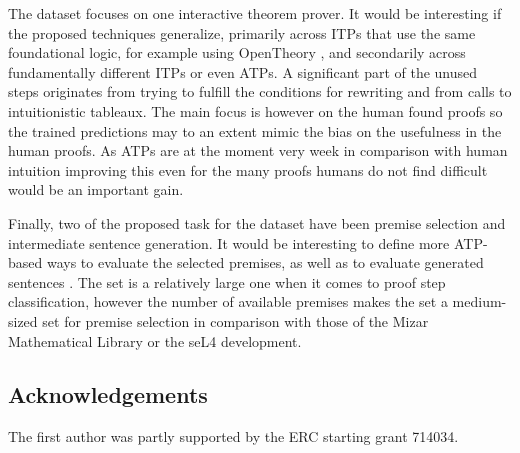 \documentclass[]{article}
\begin{document}
The dataset focuses on one interactive theorem prover. It would be interesting
if the proposed techniques generalize, primarily across ITPs that use the same
foundational logic, for example using OpenTheory \citep{opentheory}, and secondarily
across fundamentally different ITPs or even ATPs. A significant part of the unused steps
originates from trying to fulfill the conditions for rewriting and
from calls to intuitionistic tableaux.
The main focus is however on the human found proofs so the trained predictions may
to an extent mimic the bias on the usefulness in the human proofs. As ATPs are at the
moment very week in comparison with human intuition improving this even for the many
proofs humans do not find difficult would be an important gain.


Finally, two of the proposed task for the dataset have been premise selection
and intermediate sentence generation. It would be interesting to
define more ATP-based ways to evaluate the selected premises, as well as to evaluate
generated sentences \citep{alignedcorpora}. The set is a relatively large one when
it comes to proof step classification,
however the number of available premises makes the set a
medium-sized set for premise selection in comparison with those of the  Mizar
Mathematical Library or the seL4 development.

\subsection*{Acknowledgements}
The first author was partly supported by the ERC starting grant 714034.


\end{document}
